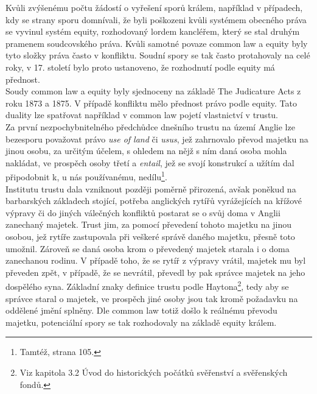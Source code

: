\documentclass{article}
\begin{document}

Kvůli zvýšenému počtu žádostí o vyřešení sporů králem, například v případech, kdy se strany sporu domnívali, že byli poškozeni kvůli systémem obecného práva se vyvinul systém equity, rozhodovaný lordem kancléřem, který se stal druhým pramenem soudcovského práva. Kvůli samotné povaze common law a equity byly tyto složky práva často v konfliktu. Soudní spory se tak často protahovaly na celé roky, v 17. století bylo proto ustanoveno, že rozhodnutí podle equity má přednost.\\

Soudy common law a equity byly sjednoceny na základě The Judicature Acts z roku 1873 a 1875. V případě konfliktu mělo přednost právo podle equity. Tato duality lze spatřovat například v common law pojetí vlastnictví v trustu.\\

Za první nezpochybnitelného předchůdce dnešního trustu na území Anglie lze bezesporu považovat právo \textit{use of land} či \textit{usus}, jež zahrnovalo převod majetku na jinou osobu, za určitým účelem, s ohledem na nějž s ním daná osoba mohla nakládat, ve prospěch osoby třetí a \textit{entail}, jež se svojí konstrukcí a užítím dal připodobnit k, u nás používanému, nedílu\footnote{Tamtéž, strana 105.}. \\

Institutu trustu dala vzniknout později poměrně přirozená, avšak poněkud na barbarských základech stojící, potřeba anglických rytířů vyrážejících na křížové výpravy či do jiných válečných konfliktů postarat se o svůj doma v Anglii zanechaný majetek. Trust jim, za pomocí převedení tohoto majetku na jinou osobou, jež rytíře zastupovala při veškeré správě daného majetku, přesně toto umožnil. Zároveň se daná osoba krom o převedený majetek starala i o doma zanechanou rodinu. V případě toho, že se rytíř z výpravy vrátil, majetek mu byl převeden zpět, v případě, že se nevrátil, převedl by pak správce majetek na jeho dospělého syna. Základní znaky definice trustu podle Haytona\footnote{Viz kapitola 3.2 Úvod do historických počátků svěřenství a svěřenských fondů.}, tedy aby se správce staral o majetek, ve prospěch jiné osoby jsou tak kromě požadavku na oddělené jmění splněny. Dle common law totiž došlo k reálnému převodu majetku, potenciální spory se tak rozhodovaly na základě equity králem.\\
\end{document}
